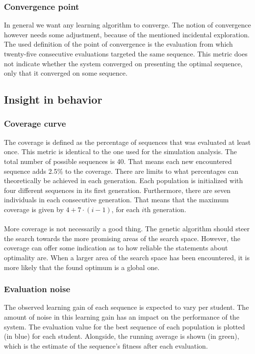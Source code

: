 \subsubsection{Convergence point}
In general we want any learning algorithm to converge. The notion of
convergence however needs some adjustment, because of the mentioned incidental
exploration. The used definition of the point of convergence is the evaluation
from which twenty-five consecutive evaluations targeted the same sequence.
This metric does not indicate whether the system converged on presenting the
optimal sequence, only that it converged on some sequence.
\subsection{Insight in behavior}
\subsubsection{Coverage curve}
The coverage is defined as the percentage of sequences that was evaluated at
least once. This metric is identical to the one used for the simulation
analysis. The total number of possible sequences is 40. That means each new
encountered sequence adds 2.5\% to the coverage. There are limits to what
percentages can theoretically be achieved in each generation. Each population
is initialized with four different sequences in its first generation.
Furthermore, there are seven individuals in each consecutive generation. That
means that the maximum coverage is given by $4+7\cdot(i-1)$, for each $i$th
generation.\\\\
\noindent
More coverage is not necessarily a good thing. The genetic algorithm should
steer the search towards the more promising areas of the search space. However,
the coverage can offer some indication as to how reliable the statements about
optimality are. When a larger area of the search space has been
encountered, it is more likely that the found optimum is a global one.
\subsubsection{Evaluation noise}
The observed learning gain of each sequence is expected to vary per student. The
amount of noise in this learning gain has an impact on the performance of the system.
The evaluation value for the best sequence of each population is plotted (in
blue) for each student. Alongside, the running average is shown (in green),
which is the estimate of the sequence's fitness after each evaluation.
